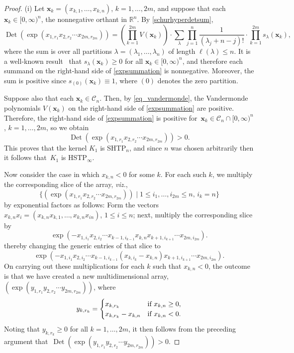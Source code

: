 \documentclass[10pt,a4paper]{amsart}
\numberwithin{equation}{section}
\def\R{{\mathbb R}}
\def\Det{\operatorname{Det}}
\def\CC{\mathcal{C}}
\def\xx{\boldsymbol{x}}
\begin{document}
\begin{proof}
(i) Let $\xx_k = (x_{k,1},\dots,x_{k,n})$, $k=1,\dots,2m$, and suppose that each $\xx_k \in [0,\infty)^n$, the nonnegative orthant in $\R^n$. By
\eqref{schurhyperdetsum},
\begin{equation}
\Det(\exp(x_{1,r_1} x_{2,r_2} \cdots x_{2m,r_{2m}})) = \left(\prod_{k=1}^{2m} V(\xx_k)\right) \cdot \sum_\lambda \prod_{j=1}^n \frac{1}{(\lambda_j + n-j)!} \cdot \prod_{k=1}^{2m} s_\lambda(\xx_k),\label{expsummation}
\end{equation}
where the sum is over all partitions $\lambda = (\lambda_1,\dots,\lambda_n)$ of length $\ell(\lambda) \le n$.
It is a well-known result~\cite{grossrichards89,macdonald} that $s_\lambda(\xx_k) \ge 0$ for all $\xx_k \in [0,\infty)^n$, and therefore each summand on the right-hand side of \eqref{expsummation} is nonnegative. Moreover, the sum is positive since $s_{(0)}(\xx_k) \equiv 1$, where $(0)$ denotes the zero partition.

Suppose also that each $\xx_k \in \CC_n$. Then, by \eqref{eq_vandermonde}, the Vandermonde polynomials $V(\xx_k)$ on the right-hand side of \eqref{expsummation} are positive. Therefore, the right-hand side of \eqref{expsummation} is positive for~${\xx_k \in \CC_n \cap [0,\infty)^n}$, $k=1,\dots,2m$, so we obtain
\[
\Det(\exp(x_{1,r_1} x_{2,r_2} \cdots x_{2m,r_{2m}})) > 0.
\]
This proves that the kernel $K_1$ is SHTP$_n$, and since $n$ was chosen arbitrarily then it follows that~$K_1$ is HSTP$_\infty$.

Now consider the case in which $x_{k,n} < 0$ for some $k$. For each such $k$, we multiply the corresponding slice of the array, {\it viz.},
\[
\{(\exp(x_{1,r_1} x_{2,r_2} \cdots x_{2m,r_{2m}})) \mid 1 \le i_1,\dots,i_{2m} \le n,\, i_k = n\}
\]
by exponential factors as follows: Form the vectors $x_{k,n}x_i = (x_{k,n}x_{k,1},\dots,x_{k,n}x_{in})$, $1 \le i \le n$; next, multiply the corresponding slice by
\[
\exp(-x_{1,i_1}x_{2,i_2} \cdots x_{k-1,i_{k-1}}x_{k,n}x_{k+1,i_{k+1}}\cdots x_{2m,i_{2m}}).
\]
thereby changing the generic entries of that slice to
\[
\exp(-x_{1,i_1}x_{2,i_2} \cdots x_{k-1,i_{k-1}}(x_{k,i_k}-x_{k,n})x_{k+1,i_{k+1}}\cdots x_{2m,i_{2m}}).
\]
On carrying out these multiplications for each $k$ such that $x_{k,n} < 0$, the outcome is that we have created a new multidimensional array, $(\exp(y_{1,r_1} y_{2,r_2} \cdots y_{2m,r_{2m}}))$, where
\[
y_{k,r_k} =
\begin{cases}
x_{k,r_k} & \hbox{if } x_{k,n} \ge 0, \\
x_{k,r_k} - x_{k,n} & \hbox{if } x_{k,n} < 0.
\end{cases}
\]
Noting that $y_{k,r_k} \ge 0$ for all $k=1,\dots,2m$, it then follows from the preceding argument that~${\Det(\exp(y_{1,r_1} y_{2,r_2} \cdots y_{2m,r_{2m}})) > 0}$.


\end{proof}
\end{document}
